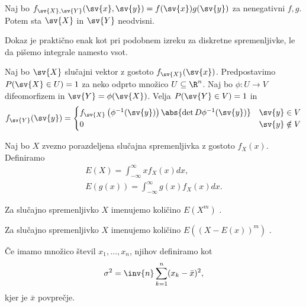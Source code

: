 \begin{izrek}
  Naj bo $f_{\sv{X}, \sv{Y}}(\sv{x}, \sv{y}) = f(\sv{x}) g(\sv{y})$ za
  nenegativni $f, g$.
  Potem sta $\sv{X}$ in $\sv{Y}$ neodvisni.
\end{izrek}

Dokaz je praktično enak kot pri podobnem izreku za diskretne spremenljivke, le
da pišemo integrale namesto vsot.

\begin{izrek}
  Naj bo $\sv{X}$ slučajni vektor z gostoto $f_{\sv{X}}(\sv{x})$.
  Predpostavimo $P(\sv{X} \in U) = 1$ za neko odprto množico $U \subseteq \R^n$.
  Naj bo $\phi : U \to V$ difeomorfizem in $\sv{Y} = \phi(\sv{X})$.
  Velja $P(\sv{Y} \in V) = 1$ in
  \[
	f_{\sv{Y}}(\sv{y}) =
	\begin{cases}
	  f_{\sv{X}}\left( \phi^{-1}(\sv{y}) \right) \abs{ \det D\phi^{-1}(\sv{y}) }
	  & \sv{y} \in V \\
	  0 & \sv{y} \notin V
	\end{cases}
  \]
\end{izrek}


\begin{definicija}
  Naj bo $X$ zvezno porazdeljena slučajna spremenljivka z gostoto $f_X(x)$.
  Definiramo
  \begin{gather*}
	E(X) = \int_{-\infty}^\infty x f_X(x) dx, \\
	E(g(x)) = \int_{-\infty}^\infty g(x) f_X(x) dx.
  \end{gather*}
\end{definicija}


\begin{definicija}
  Za slučajno spremenljivko $X$ imenujemo količino $E(X^m)$ .
\end{definicija}

\begin{definicija}
  Za slučajno spremenljivko $X$ imenujemo količino $E( {(X - E(x))}^m )$
  .
\end{definicija}


\begin{definicija}
  Če imamo množico števil $x_1, \ldots, x_n$, njihov  definiramo
  kot
  \[
	\sigma^2 = \inv{n} \sum_{k=1}^n (x_k - \bar{x})^2,
  \]
  kjer je $\bar{x}$ povprečje.
\end{definicija}

